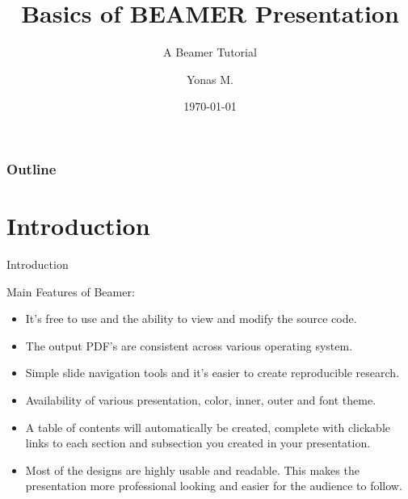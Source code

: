 \documentclass[10pt,xcolor=x11names]{beamer}
\title[Latex Beamer]{Basics of BEAMER Presentation  }
\subtitle{A Beamer Tutorial}
\author{Yonas M.}
\institute[Ethiopian Institute of Water Resources]
{Ethiopian Institute of Water Resources\\
Addis Abeba University}
\date{\today}
\begin{document}


\begin{frame} \maketitle \end{frame}

\begin{frame}[allowframebreaks]
\frametitle{Outline}
\tableofcontents%
\end{frame}


\section{Introduction}

\begin{frame} {Introduction} \label{intro}

\begin{exampleblock}{ Main Features of Beamer:}

\begin{itemize}

\item It's free to use and the ability to view and modify the source code.

\item The output PDF's are consistent across various operating system.

\item Simple slide navigation tools and it's easier to create reproducible research.

\item Availability of various presentation, color, inner, outer and font theme.

\item A table of contents will automatically be created, complete with clickable links to each section and subsection you created in your presentation.

\item Most of the designs are highly usable and readable. This makes the presentation more professional looking and easier for the audience to follow.

\end{itemize}
\end{exampleblock}
\hyperlink{hyper1}{}
\end{frame}
\end{document}
